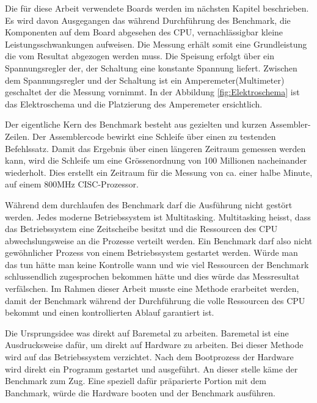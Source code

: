 Die für diese Arbeit verwendete Boards werden im nächsten Kapitel beschrieben. Es wird davon Ausgegangen das während Durchführung des Benchmark, die Komponenten auf dem Board abgesehen des CPU, vernachlässigbar kleine Leistungsschwankungen aufweisen. Die Messung erhält somit eine Grundleistung die vom Resultat abgezogen werden muss. Die Speisung erfolgt über ein Spannungsregler der, der Schaltung eine konstante Spannung liefert. Zwischen dem Spannungsregler und der Schaltung ist ein Amperemeter(Multimeter) geschaltet der die Messung vornimmt. In der Abbildung \ref{fig:Elektroschema} ist das Elektroschema und die Platzierung des Amperemeter ersichtlich.
\par
Der eigentliche Kern des Benchmark besteht aus gezielten und kurzen Assembler-Zeilen. Der Assemblercode bewirkt eine Schleife über einen zu testenden Befehlssatz. Damit das Ergebnis über einen längeren Zeitraum gemessen werden kann, wird die Schleife um eine Grössenordnung von 100 Millionen nacheinander wiederholt. Dies erstellt ein Zeitraum für die Messung von ca. einer halbe Minute, auf einem 800MHz CISC-Prozessor.
\par
Während dem durchlaufen des Benchmark darf die Ausführung nicht gestört werden. Jedes moderne Betriebssystem ist Multitasking. Multitasking heisst, dass das Betriebssystem eine Zeitscheibe besitzt und die Ressourcen des CPU abwechslungsweise an die Prozesse verteilt werden. Ein Benchmark darf also nicht gewöhnlicher Prozess von einem Betriebssystem gestartet werden. Würde man das tun hätte man keine Kontrolle wann und wie viel Ressourcen der Benchmark schlussendlich zugesprochen bekommen hätte und dies würde das Messresultat verfälschen. Im Rahmen dieser Arbeit musste eine Methode erarbeitet werden, damit der Benchmark während der Durchführung die volle Ressourcen des CPU bekommt und einen kontrollierten Ablauf garantiert ist.
\par
Die Ursprungsidee was direkt auf Baremetal zu arbeiten. Baremetal ist eine Ausdrucksweise dafür, um direkt auf Hardware zu arbeiten. Bei dieser Methode wird auf das Betriebssystem verzichtet. Nach dem Bootprozess der Hardware wird direkt ein Programm gestartet und ausgeführt. An dieser stelle käme der Benchmark zum Zug. Eine speziell dafür präparierte Portion mit dem Banchmark, würde die Hardware booten und der Benchmark ausführen.
\par

